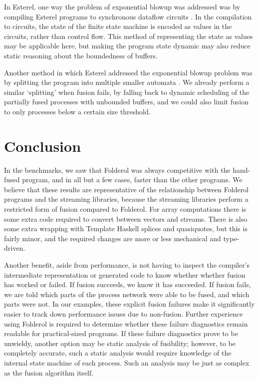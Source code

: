 In Esterel, one way the problem of exponential blowup was addressed was by compiling Esterel programs to synchronous dataflow circuits \citep{berry1992hardware}.
In the compilation to circuits, the state of the finite state machine is encoded as values in the circuits, rather than control flow.
This method of representing the state as values may be applicable here, but making the program state dynamic may also reduce static reasoning about the boundedness of buffers.

Another method in which Esterel addressed the exponential blowup problem was by splitting the program into multiple smaller automata \citep{berry1992esterel}.
We already perform a similar `splitting' when fusion fails, by falling back to dynamic scheduling of the partially fused processes with unbounded buffers, and we could also limit fusion to only processes below a certain size threshold.


\section{Conclusion}
In the benchmarks, we saw that Folderol was always competitive with the hand-fused program, and in all but a few cases, faster than the other programs.
We believe that these results are representative of the relationship between Folderol programs and the streaming libraries, because the streaming libraries perform a restricted form of fusion compared to Folderol.
For array computations there is some extra code required to convert between vectors and streams.
There is also some extra wrapping with Template Haskell splices and quasiquotes, but this is fairly minor, and the required changes are more or less mechanical and type-driven.

Another benefit, aside from performance, is not having to inspect the compiler's intermediate representation or generated code to know whether whether fusion has worked or failed.
If fusion succeeds, we know it has succeeded.
If fusion fails, we are told which parts of the process network were able to be fused, and which parts were not.
In our examples, these explicit fusion failures make it significantly easier to track down performance issues due to non-fusion.
Further experience using Folderol is required to determine whether these failure diagnostics remain readable for practical-sized programs.
If these failure diagnostics prove to be unwieldy, another option may be static analysis of fusibility; however, to be completely accurate, such a static analysis would require knowledge of the internal state machine of each process.
Such an analysis may be just as complex as the fusion algorithm itself.

